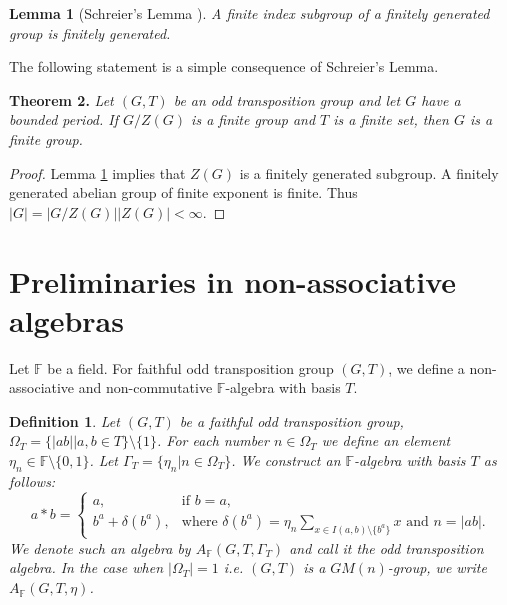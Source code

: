 \documentclass[12pt]{article}
\newcommand\F{\mathbb{F}}
\newtheorem{lem}{Lemma}
\newtheorem{defi}{Definition}
\begin{document}
\begin{lem}[Schreier’s Lemma  \cite{Sh26}]\label{sh26}
	A finite index subgroup of a finitely generated group is finitely generated.
	
\end{lem}
The following statement is a simple consequence of Schreier's Lemma.

\bigskip
\noindent\textbf{Theorem 2.}
\textit{ 
	Let $(G,T)$ be an odd transposition group and let $G$ have a bounded period. If $G/Z(G)$ is a finite group and $T$ is a finite set, then $G$ is a finite group.
}
\begin{proof}
Lemma \ref{sh26} implies that $Z(G)$ is a finitely generated subgroup. A finitely generated abelian group of finite exponent is finite. Thus $|G|=|G/Z(G)||Z(G)|<\infty$.
\end{proof}


\section{Preliminaries in non-associative algebras}	
Let $\F$ be a field. For faithful odd transposition group $(G,T)$, we define a non-associative and non-commutative $\F$-algebra with basis $T$.	

\begin{defi}
Let $(G,T)$ be a faithful odd transposition group, $\Omega_T=\{|ab||a,b\in T\}\setminus\{1\}$. For each number $n\in\Omega_T$ we define an element $\eta_n\in\F\setminus\{0,1\}$. Let $\Gamma_T=\{\eta_n|n\in \Omega_T\}$.
We construct an $\F$-algebra with basis $T$ as follows:
%
$$
a * b = 
\begin{cases} 
a, & \text{if } b = a, \\
b^a+\delta(b^a), & \text{where } \delta(b^a)=\eta_n\sum_{x\in I(a,b)\setminus \{b^a\}}x \text{ and } n=|ab|.
\end{cases}
$$
%
We denote such an algebra by $A_{\F}(G,T,\Gamma_T)$ and call it the odd transposition algebra. In the case when $|\Omega_T|=1$ i.e. $(G,T)$ is a $GM(n)$-group, we write $A_{\F}(G,T,\eta)$.
\end{defi}
\end{document}
